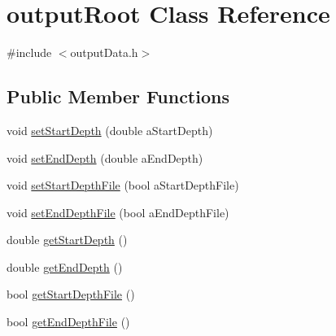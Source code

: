 \hypertarget{classoutput_root}{
\section{outputRoot Class Reference}
\label{classoutput_root}
}


{\ttfamily \#include $<$outputData.h$>$}\subsection*{Public Member Functions}
\begin{DoxyCompactItemize}
\item 
void \hyperlink{classoutput_root_a1a1aa7740a66961e4348a6aa1874354e}{setStartDepth} (double aStartDepth)
\item 
void \hyperlink{classoutput_root_a7751413cbb2ca69736014365e393b252}{setEndDepth} (double aEndDepth)
\item 
void \hyperlink{classoutput_root_a40e1650e258c23ae44afdd3e399a7d38}{setStartDepthFile} (bool aStartDepthFile)
\item 
void \hyperlink{classoutput_root_adcd955b3304ed6a03b926d8dc060cd13}{setEndDepthFile} (bool aEndDepthFile)
\item 
double \hyperlink{classoutput_root_a4f67ae8b19459fffc4dfce60c3e240c1}{getStartDepth} ()
\item 
double \hyperlink{classoutput_root_ad08bca9e6f7597acc61b9802b16d9f77}{getEndDepth} ()
\item 
bool \hyperlink{classoutput_root_ab142f85c1a6e3512fe952491fdc15691}{getStartDepthFile} ()
\item 
bool \hyperlink{classoutput_root_a27e5c67b135531f5f9b9f67ecad623a8}{getEndDepthFile} ()
\end{DoxyCompactItemize}


